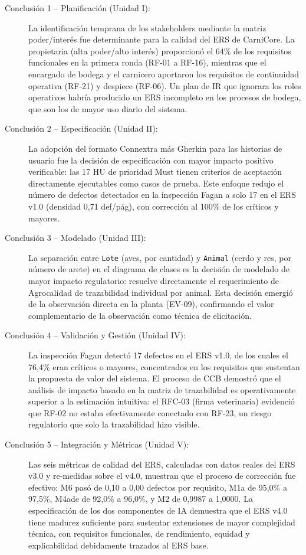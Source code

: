 \documentclass[11pt,a4paper]{article}
\begin{document}
\begin{description}
  \item[Conclusión 1 -- Planificación (Unidad I):] La identificación temprana de los stakeholders mediante la matriz poder/interés fue determinante para la calidad del ERS de CarniCore. La propietaria (alta poder/alto interés) proporcionó el 64\% de los requisitos funcionales en la primera ronda (RF-01 a RF-16), mientras que el encargado de bodega y el carnicero aportaron los requisitos de continuidad operativa (RF-21) y despiece (RF-06). Un plan de IR que ignorara los roles operativos habría producido un ERS incompleto en los procesos de bodega, que son los de mayor uso diario del sistema.

  \item[Conclusión 2 -- Especificación (Unidad II):] La adopción del formato Connextra más Gherkin para las historias de usuario fue la decisión de especificación con mayor impacto positivo verificable: las 17 HU de prioridad Must tienen criterios de aceptación directamente ejecutables como casos de prueba. Este enfoque redujo el número de defectos detectados en la inspección Fagan a solo 17 en el ERS v1.0 (densidad 0,71 def/pág), con corrección al 100\% de los críticos y mayores.

  \item[Conclusión 3 -- Modelado (Unidad III):] La separación entre \texttt{Lote} (aves, por cantidad) y \texttt{Animal} (cerdo y res, por número de arete) en el diagrama de clases es la decisión de modelado de mayor impacto regulatorio: resuelve directamente el requerimiento de Agrocalidad de trazabilidad individual por animal. Esta decisión emergió de la observación directa en la planta (EV-09), confirmando el valor complementario de la observación como técnica de elicitación.

  \item[Conclusión 4 -- Validación y Gestión (Unidad IV):] La inspección Fagan detectó 17 defectos en el ERS v1.0, de los cuales el 76,4\% eran críticos o mayores, concentrados en los requisitos que sustentan la propuesta de valor del sistema. El proceso de CCB demostró que el análisis de impacto basado en la matriz de trazabilidad es operativamente superior a la estimación intuitiva: el RFC-03 (firma veterinaria) evidenció que RF-02 no estaba efectivamente conectado con RF-23, un riesgo regulatorio que solo la trazabilidad hizo visible.

  \item[Conclusión 5 -- Integración y Métricas (Unidad V):] Las seis métricas de calidad del ERS, calculadas con datos reales del ERS v3.0 y re-medidas sobre el v4.0, muestran que el proceso de corrección fue efectivo: M6 pasó de 0,10 a 0,00 defectos por requisito, M1a de 95,0\% a 97,5\%, M4ade de 92,0\% a 96,0\%, y M2 de 0,9987 a 1,0000. La especificación de los dos componentes de IA demuestra que el ERS v4.0 tiene madurez suficiente para sustentar extensiones de mayor complejidad técnica, con requisitos funcionales, de rendimiento, equidad y explicabilidad debidamente trazados al ERS base.
\end{description}
\end{document}
